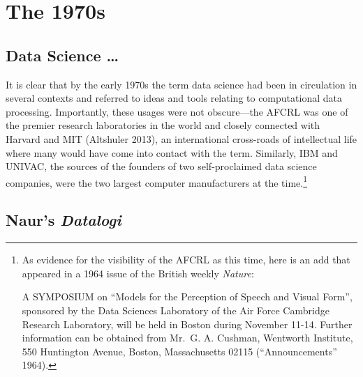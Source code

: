 \documentclass[
  letterpaper,
]{report}
\begin{document}
\hypertarget{the-1970s}{%
\section{The 1970s}\label{the-1970s}}

\hypertarget{data-science}{%
\subsection{Data Science \ldots{}}\label{data-science}}

It is clear that by the early 1970s the term data science had been in
circulation in several contexts and referred to ideas and tools relating
to computational data processing. Importantly, these usages were not
obscure---the AFCRL was one of the premier research laboratories in the
world and closely connected with Harvard and MIT (Altshuler 2013), an
international cross-roads of intellectual life where many would have
come into contact with the term. Similarly, IBM and UNIVAC, the sources
of the founders of two self-proclaimed data science companies, were the
two largest computer manufacturers at the time.\footnote{As evidence for
  the visibility of the AFCRL as this time, here is an add that appeared
  in a 1964 issue of the British weekly \emph{Nature}:

  A SYMPOSIUM on ``Models for the Perception of Speech and Visual
  Form'', sponsored by the Data Sciences Laboratory of the Air Force
  Cambridge Research Laboratory, will be held in Boston during November
  11-14. Further information can be obtained from Mr.~G. A. Cushman,
  Wentworth Institute, 550 Huntington Avenue, Boston, Massachusetts
  02115 ({``Announcements''} 1964).}

\hypertarget{naurs-datalogi}{%
\subsection{\texorpdfstring{Naur's
\emph{Datalogi}}{Naur's Datalogi}}\label{naurs-datalogi}}
\end{document}
